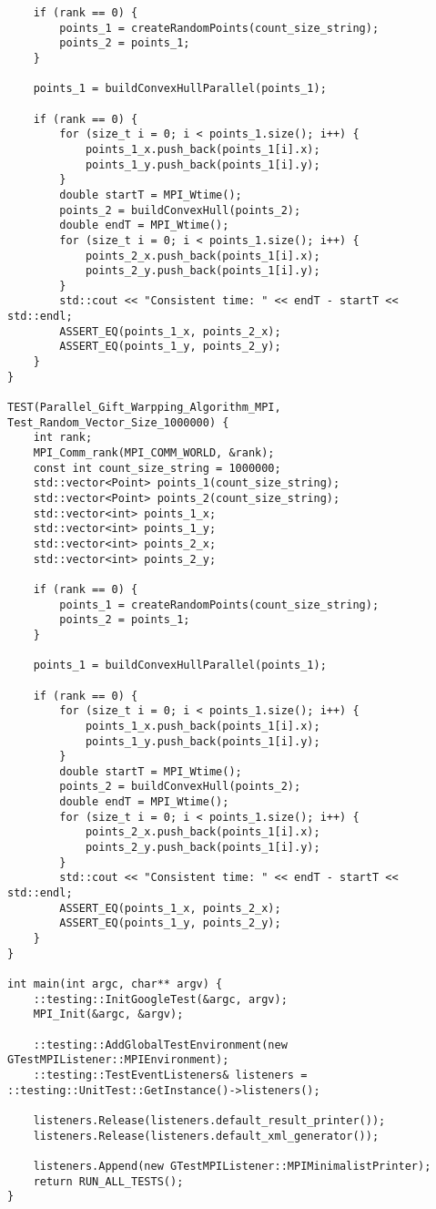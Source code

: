 \documentclass{report}
\begin{document}
\begin{lstlisting}
    if (rank == 0) {
        points_1 = createRandomPoints(count_size_string);
        points_2 = points_1;
    }

    points_1 = buildConvexHullParallel(points_1);

    if (rank == 0) {
        for (size_t i = 0; i < points_1.size(); i++) {
            points_1_x.push_back(points_1[i].x);
            points_1_y.push_back(points_1[i].y);
        }
        double startT = MPI_Wtime();
        points_2 = buildConvexHull(points_2);
        double endT = MPI_Wtime();
        for (size_t i = 0; i < points_1.size(); i++) {
            points_2_x.push_back(points_1[i].x);
            points_2_y.push_back(points_1[i].y);
        }
        std::cout << "Consistent time: " << endT - startT << std::endl;
        ASSERT_EQ(points_1_x, points_2_x);
        ASSERT_EQ(points_1_y, points_2_y);
    }
}

TEST(Parallel_Gift_Warpping_Algorithm_MPI, Test_Random_Vector_Size_1000000) {
    int rank;
    MPI_Comm_rank(MPI_COMM_WORLD, &rank);
    const int count_size_string = 1000000;
    std::vector<Point> points_1(count_size_string);
    std::vector<Point> points_2(count_size_string);
    std::vector<int> points_1_x;
    std::vector<int> points_1_y;
    std::vector<int> points_2_x;
    std::vector<int> points_2_y;

    if (rank == 0) {
        points_1 = createRandomPoints(count_size_string);
        points_2 = points_1;
    }

    points_1 = buildConvexHullParallel(points_1);

    if (rank == 0) {
        for (size_t i = 0; i < points_1.size(); i++) {
            points_1_x.push_back(points_1[i].x);
            points_1_y.push_back(points_1[i].y);
        }
        double startT = MPI_Wtime();
        points_2 = buildConvexHull(points_2);
        double endT = MPI_Wtime();
        for (size_t i = 0; i < points_1.size(); i++) {
            points_2_x.push_back(points_1[i].x);
            points_2_y.push_back(points_1[i].y);
        }
        std::cout << "Consistent time: " << endT - startT << std::endl;
        ASSERT_EQ(points_1_x, points_2_x);
        ASSERT_EQ(points_1_y, points_2_y);
    }
}

int main(int argc, char** argv) {
    ::testing::InitGoogleTest(&argc, argv);
    MPI_Init(&argc, &argv);

    ::testing::AddGlobalTestEnvironment(new GTestMPIListener::MPIEnvironment);
    ::testing::TestEventListeners& listeners = ::testing::UnitTest::GetInstance()->listeners();

    listeners.Release(listeners.default_result_printer());
    listeners.Release(listeners.default_xml_generator());

    listeners.Append(new GTestMPIListener::MPIMinimalistPrinter);
    return RUN_ALL_TESTS();
}
\end{lstlisting}
\end{document}
